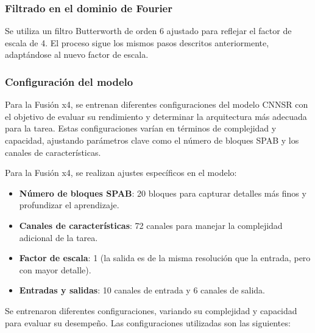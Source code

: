         \subsubsection{Filtrado en el dominio de Fourier}

            Se utiliza un filtro Butterworth de orden 6 ajustado para reflejar el factor de escala de 4. El proceso sigue los mismos pasos descritos anteriormente, adaptándose al nuevo factor de escala.


        \subsubsection{Configuración del modelo}

            Para la Fusión x4, se entrenan diferentes configuraciones del modelo CNNSR con el objetivo de evaluar su rendimiento y determinar la arquitectura más adecuada para la tarea. Estas configuraciones varían en términos de complejidad y capacidad, ajustando parámetros clave como el número de bloques SPAB y los canales de características.

            Para la Fusión x4, se realizan ajustes específicos en el modelo:

            \begin{itemize}
                \item \textbf{Número de bloques SPAB}: 20 bloques para capturar detalles más finos y profundizar el aprendizaje.
                \item \textbf{Canales de características}: 72 canales para manejar la complejidad adicional de la tarea.
                \item \textbf{Factor de escala}: 1 (la salida es de la misma resolución que la entrada, pero con mayor detalle).
                \item \textbf{Entradas y salidas}: 10 canales de entrada y 6 canales de salida.
            \end{itemize}

            Se entrenaron diferentes configuraciones, variando su complejidad y capacidad para evaluar su desempeño. Las configuraciones utilizadas son las siguientes:

